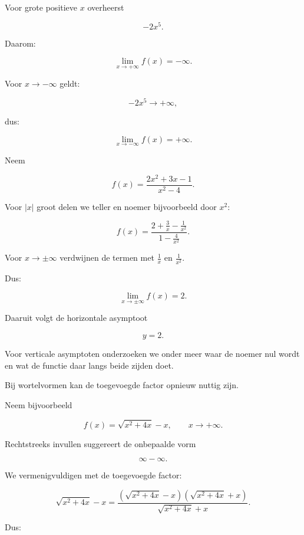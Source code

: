 \documentclass{ximera}
\begin{document}
Voor grote positieve $x$ overheerst

\[
-2x^5.
\]

Daarom:

\[
\boxed{
\lim_{x\to+\infty}f(x)=-\infty.
}
\]

Voor $x\to-\infty$ geldt:

\[
-2x^5\to+\infty,
\]

dus:

\[
\boxed{
\lim_{x\to-\infty}f(x)=+\infty.
}
\]




Neem

\[
f(x)=\frac{2x^2+3x-1}{x^2-4}.
\]

Voor $|x|$ groot delen we teller en noemer bijvoorbeeld door $x^2$:

\[
f(x)
=
\frac{
2+\frac3x-\frac1{x^2}
}{
1-\frac4{x^2}
}.
\]

Voor $x\to\pm\infty$ verdwijnen de termen met $\frac1x$ en
$\frac1{x^2}$.

Dus:

\[
\boxed{
\lim_{x\to\pm\infty}f(x)=2.
}
\]

Daaruit volgt de horizontale asymptoot

\[
\boxed{y=2.}
\]

Voor verticale asymptoten onderzoeken we onder meer waar de noemer
nul wordt en wat de functie daar langs beide zijden doet.




Bij wortelvormen kan de toegevoegde factor opnieuw nuttig zijn.

Neem bijvoorbeeld

\[
f(x)=\sqrt{x^2+4x}-x,
\qquad x\to+\infty.
\]

Rechtstreeks invullen suggereert de onbepaalde vorm

\[
\infty-\infty.
\]

We vermenigvuldigen met de toegevoegde factor:

\[
\sqrt{x^2+4x}-x
=
\frac{
(\sqrt{x^2+4x}-x)(\sqrt{x^2+4x}+x)
}{
\sqrt{x^2+4x}+x
}.
\]

Dus:
\end{document}

